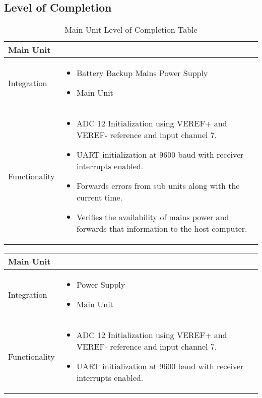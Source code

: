 \begin{landscape}
\subsection{Level of Completion}
  \begin{table}[!ht]
    \begin{tabularx}{\textwidth}{|X|X|}
      \hline
      \multicolumn{2}{|X|}{Main Unit}\\
      \hline
      Integration&\begin{itemize}
                    \item Battery Backup Mains Power Supply
                    \item Main Unit
                  \end{itemize}\\
                  \hline
      Functionality&\begin{itemize}
          \item ADC 12 Initialization using VEREF+ and VEREF- reference and input channel 7.
          \item UART initialization at 9600 baud with receiver interrupts enabled.
          \item Forwards errors from sub units along with the current time.
          \item Verifies the availability of mains power and forwards that information to the host computer.
        \end{itemize}\\
      \hline
    \end{tabularx}
    \caption{Main Unit Level of Completion Table}
    \label{tab:main-unit-completion-table}
  \end{table}
  \begin{table}[!ht]
    \begin{tabularx}{\textwidth}{|X|X|}
      \hline
      \multicolumn{2}{|X|}{Main Unit}\\
      \hline
      Integration&\begin{itemize}
                    \item Power Supply
                    \item Main Unit
                  \end{itemize}\\
                  \hline
      Functionality&\begin{itemize}
          \item ADC 12 Initialization using VEREF+ and VEREF- reference and input channel 7.
          \item UART initialization at 9600 baud with receiver interrupts enabled.

\end{itemize}
\end{tabularx}
\end{table}
\end{landscape}
